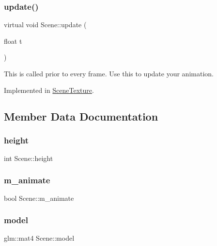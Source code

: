 \mbox{\label{class_scene_aafa9ccf4d019005fdd41672afd13a7a9}} 
\subsubsection{\texorpdfstring{update()}{update()}}
{\footnotesize\ttfamily virtual void Scene\+::update (\begin{DoxyParamCaption}\item[{float}]{t }\end{DoxyParamCaption})\hspace{0.3cm}{\ttfamily [pure virtual]}}

This is called prior to every frame. Use this to update your animation. 

Implemented in \mbox{\hyperlink{class_scene_texture_a345ac4834ce9785ed91e24d25046a835}{Scene\+Texture}}.



\subsection{Member Data Documentation}
\mbox{\label{class_scene_a03e1d101ff6c2dbbe8da3ba812cde0f7}} 
\subsubsection{\texorpdfstring{height}{height}}
{\footnotesize\ttfamily int Scene\+::height}

\mbox{\label{class_scene_ac9faebc03e9de1f056c399cd57142044}} 
\subsubsection{\texorpdfstring{m\_animate}{m\_animate}}
{\footnotesize\ttfamily bool Scene\+::m\+\_\+animate\hspace{0.3cm}{\ttfamily [protected]}}

\mbox{\label{class_scene_adb9af7d1ae176f7dd37ae98dd8c17f33}} 
\subsubsection{\texorpdfstring{model}{model}}
{\footnotesize\ttfamily glm\+::mat4 Scene\+::model\hspace{0.3cm}{\ttfamily [protected]}}

